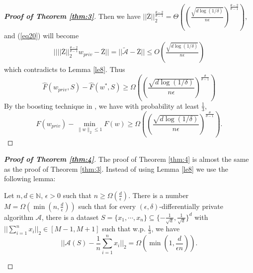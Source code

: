 \documentclass[12pt]{alt2022} %
\renewcommand{\tilde}{\widetilde}
\begin{document}
\begin{proof}[{\bf Proof of Theorem \ref{thm:3}}]
 Then we have $||\overline{\mathrm{Z}}||_2^{\frac{\theta-2}{\theta-1}}=\Theta\left(\left( \frac{\sqrt{d\log(1/\delta)}}{n\epsilon} \right)^{\frac{\theta-2}{\theta-1}}\right)$, and (\ref{eq20}) will become
 	\begin{equation*}
 \begin{aligned}
 ||||\overline{\mathrm{Z}}||_2^{\frac{\theta-2}{\theta-1}}w_{priv}-\overline{\mathrm{Z}}||=||\tilde{\mathcal{A}}-\overline{\mathrm{Z}}||
 \leq O\left( \frac{\sqrt{d\log(1/\delta)}}{n\epsilon}\right)
 \end{aligned}
 \end{equation*}
 which contradicts to Lemma \ref{le8}.
 Thus 	
 \begin{equation}
 \hat{F}(w_{priv},S)-\hat{F}(w^{*},S)  \geq\Omega\left( \left(\frac{\sqrt{d\log(1/\delta)}}{n\epsilon}\right)^{\frac{\theta}{\theta-1}}\right)
 \end{equation}
 By the boosting technique in \citep{bassily2019private}, we have with probability at least $\frac{1}{3}$, 
 \begin{equation*}
 F(w_{priv})-\min_{\|w\|_2\leq 1}F(w) \geq\Omega\left( \left(\frac{\sqrt{d\log(1/\delta)}}{n\epsilon}\right)^{\frac{\theta}{\theta-1}}\right).
 \end{equation*}
	\end{proof}
		\begin{proof}[{\bf Proof of Theorem \ref{thm:4}}]
	The proof of Theorem \ref{thm:4} is almost the same as the proof of Theorem \ref{thm:3}. Instead of using Lemma \ref{le8} we use the following lemma: 
	\begin{lemma}
	    Let $n,d\in \mathbb{N}$, $\epsilon>0$ such that $n\geq \Omega(\frac{d}{\epsilon})$. There is a number $M=\Omega\left(\min\left(n,\frac{d}{\epsilon}\right)\right)$ such that for every $(\epsilon, \delta)$-differentially private algorithm $\mathcal{A}$, there is a dataset $S=\{x_1,\cdots,x_n\}\subseteq \{-\frac{1}{\sqrt{d}},\frac{1}{\sqrt{d}}\}^d$ with $||\sum_{i=1}^{n}x_i||_2\in[M-1,M+1]$ such that w.p. $\frac{1}{3}$, we have 
	\begin{equation}
||\mathcal{A}(S)-\frac{1}{n}\sum_{i=1}^nx_i||_2=\Omega\left(\min\left(1,\frac{d}{\epsilon n}\right)\right).
\end{equation}
	\end{lemma}
	\end{proof}
\end{document}
